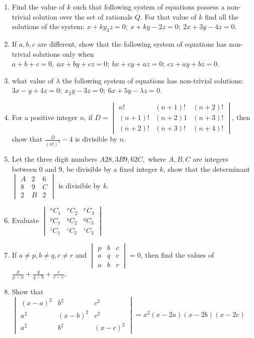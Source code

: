 \begin{enumerate}[resume]
\item Find the value of $k$ such that following system of equations possess a non-trivial solution over the set of rationals
  $Q$. For that value of $k$ find all the solutions of the system: $x + ky _ 3z = 0;\ x + ky - 2z = 0;\ 2x + 3y - 4z = 0$.
\item If $a, b, c$ are different, show that the following system of equations has non-trivial solutions only when $a + b + c =
  0,\ ax + by + cz = 0;\ bx + cy + az = 0;\ cz + ay + bz = 0$.
\item  what value of $\lambda$ the following system of equations has non-trivial solutions: $3x - y + 4z = 0;\ x _ 2y - 3z = 0;\ 6x
  + 5y - \lambda z = 0$.
\item For a positive integer $n$, if $D = \begin{vmatrix}n! & (n + 1)! & (n + 2)!\\(n + 1)! & (n + 2)1 & (n + 3)! \\(n + 2)! & (n +
  3)! & (n + 4)!\end{vmatrix}$, then show that $\frac{D}{(n!)^3} - 4$ is divisible by $n$.
\item Let the three digit numbers $A28, 3B9, 62C,$ where $A, B, C$ are integers between $0$ and $9$, be divisible by a fixed
  integer $k$, show that the determinant $\begin{vmatrix}A & 2 & 6\\ 8 & 9 & C \\ 2 & B& 2\end{vmatrix}$ is divisible by $k$.
\item Evaluate $\begin{vmatrix}{}^xC_1 & {}^xC_2 & {}^xC_3\\{}^yC_1 & {}^yC_2 & {}^yC_3\\{}^zC_1 & {}^zC_2 & {}^zC_3\end{vmatrix}$
\item If $a\neq p, b\neq q, c\neq r$ and $\begin{vmatrix}p & b & c\\a & q & c\\a & b & r\end{vmatrix} = 0$, then find the values of
  $\frac{p}{p - a} + \frac{q}{q - b} + \frac{r}{r - c}$.
\item Show that $\begin{vmatrix}(x - a)^2 & b^2 & c^2 \\a^2 & (x - b)^2 & c^2\\a^2 & b^2 & (x - c)^2\end{vmatrix} = x^2(x - 2a)(x -
  2b)(x - 2c)$


\end{enumerate}
